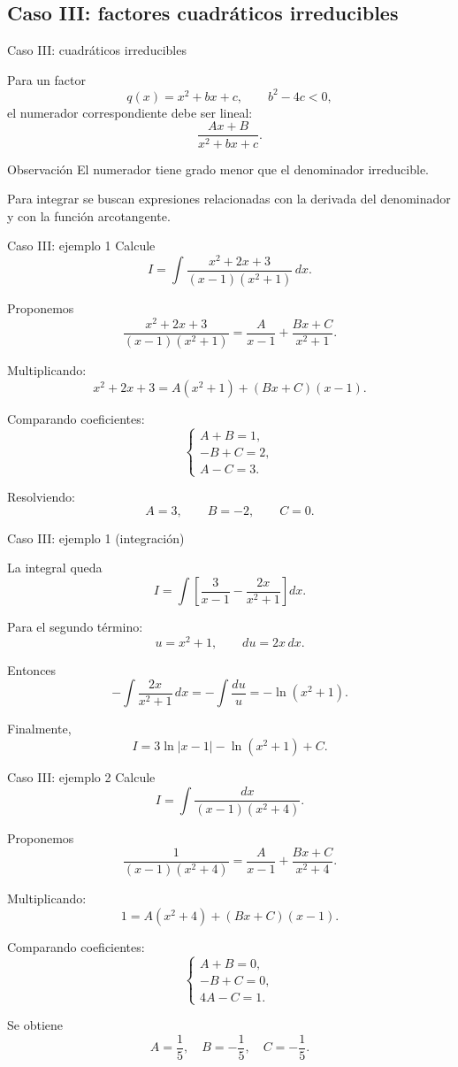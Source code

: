 \documentclass[10pt,aspectratio=169]{beamer}
\begin{document}
\subsection{Caso III: factores cuadráticos irreducibles}

\begin{frame}{Caso III: cuadráticos irreducibles}
\small

Para un factor
\[
q(x)=x^2+bx+c,
\qquad b^2-4c<0,
\]
el numerador correspondiente debe ser lineal:
\[
\boxed{
\frac{Ax+B}{x^2+bx+c}.
}
\]

\begin{block}{Observación}
El numerador tiene grado menor que el
denominador irreducible.

Para integrar se buscan expresiones
relacionadas con la derivada del
denominador y con la función arcotangente.
\end{block}
\end{frame}

\begin{frame}{Caso III: ejemplo 1}
\small
Calcule
\[
I=\int
\frac{x^2+2x+3}{(x-1)(x^2+1)}\,dx.
\]

Proponemos
\[
\frac{x^2+2x+3}{(x-1)(x^2+1)}
=
\frac{A}{x-1}
+\frac{Bx+C}{x^2+1}.
\]

Multiplicando:
\[
x^2+2x+3
=
A(x^2+1)+(Bx+C)(x-1).
\]

Comparando coeficientes:
\[
\begin{cases}
A+B=1,\\
-B+C=2,\\
A-C=3.
\end{cases}
\]

Resolviendo:
\[
\boxed{
A=3,\qquad B=-2,\qquad C=0.
}
\]
\end{frame}

\begin{frame}{Caso III: ejemplo 1 (integración)}
\small

La integral queda
\[
I=\int\left[
\frac3{x-1}-\frac{2x}{x^2+1}
\right]dx.
\]

Para el segundo término:
\[
u=x^2+1,
\qquad du=2x\,dx.
\]

Entonces
\[
-\int\frac{2x}{x^2+1}\,dx
=
-\int\frac{du}{u}
=
-\ln(x^2+1).
\]

Finalmente,
\[
\boxed{
I=3\ln|x-1|-\ln(x^2+1)+C.
}
\]
\end{frame}

\begin{frame}{Caso III: ejemplo 2}
\small
Calcule
\[
I=\int\frac{dx}{(x-1)(x^2+4)}.
\]

Proponemos
\[
\frac1{(x-1)(x^2+4)}
=
\frac{A}{x-1}
+\frac{Bx+C}{x^2+4}.
\]

Multiplicando:
\[
1=A(x^2+4)+(Bx+C)(x-1).
\]

Comparando coeficientes:
\[
\begin{cases}
A+B=0,\\
-B+C=0,\\
4A-C=1.
\end{cases}
\]

Se obtiene
\[
A=\frac15,\quad
B=-\frac15,\quad
C=-\frac15.
\]
\end{frame}
\end{document}
